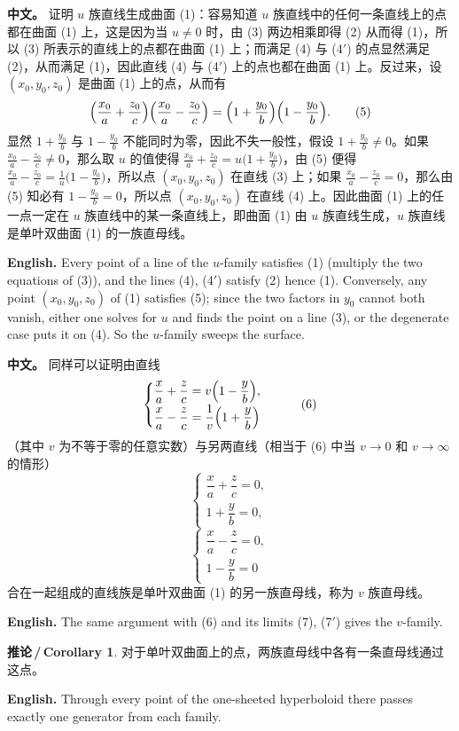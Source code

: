 \documentclass[UTF8,11pt,a4paper]{ctexart}
\newcommand{\APS}[2]{\par\noindent\textbf{中文。} #1\par\noindent\textbf{English.} #2\par\smallskip}
\newcommand{\EN}[1]{\par\noindent \textbf{English.} #1\par}
\theoremstyle{definition}
\newtheorem*{corollary}{推论\,/\,Corollary}
\begin{document}
\APS{证明 $u$ 族直线生成曲面 (1)：容易知道 $u$ 族直线中的任何一条直线上的点都在曲面 (1) 上，这是因为当 $u\ne0$ 时，由 (3) 两边相乘即得 (2) 从而得 (1)，所以 (3) 所表示的直线上的点都在曲面 (1) 上；而满足 (4) 与 (4$'$) 的点显然满足 (2)，从而满足 (1)，因此直线 (4) 与 (4$'$) 上的点也都在曲面 (1) 上。反过来，设 $(x_0,y_0,z_0)$ 是曲面 (1) 上的点，从而有
\[
\Bigl(\frac{x_0}{a}+\frac{z_0}{c}\Bigr)\Bigl(\frac{x_0}{a}-\frac{z_0}{c}\Bigr)=\Bigl(1+\frac{y_0}{b}\Bigr)\Bigl(1-\frac{y_0}{b}\Bigr).\tag{5}
\]
显然 $1+\frac{y_0}{b}$ 与 $1-\frac{y_0}{b}$ 不能同时为零，因此不失一般性，假设 $1+\frac{y_0}{b}\ne0$。如果 $\frac{x_0}{a}-\frac{z_0}{c}\ne0$，那么取 $u$ 的值使得 $\frac{x_0}{a}+\frac{z_0}{c}=u\bigl(1+\frac{y_0}{b}\bigr)$，由 (5) 便得 $\frac{x_0}{a}-\frac{z_0}{c}=\frac1u\bigl(1-\frac{y_0}{b}\bigr)$，所以点 $(x_0,y_0,z_0)$ 在直线 (3) 上；如果 $\frac{x_0}{a}-\frac{z_0}{c}=0$，那么由 (5) 知必有 $1-\frac{y_0}{b}=0$，所以点 $(x_0,y_0,z_0)$ 在直线 (4) 上。因此曲面 (1) 上的任一点一定在 $u$ 族直线中的某一条直线上，即曲面 (1) 由 $u$ 族直线生成，$u$ 族直线是单叶双曲面 (1) 的一族直母线。}{Every point of a line of the $u$-family satisfies (1) (multiply the two equations of (3)), and the lines (4), (4$'$) satisfy (2) hence (1). Conversely, any point $(x_0,y_0,z_0)$ of (1) satisfies (5); since the two factors in $y_0$ cannot both vanish, either one solves for $u$ and finds the point on a line (3), or the degenerate case puts it on (4). So the $u$-family sweeps the surface.}

\APS{同样可以证明由直线
\[
\begin{cases}\dfrac{x}{a}+\dfrac{z}{c}=v\Bigl(1-\dfrac{y}{b}\Bigr),\\[4pt] \dfrac{x}{a}-\dfrac{z}{c}=\dfrac1v\Bigl(1+\dfrac{y}{b}\Bigr)\end{cases}\tag{6}
\]
（其中 $v$ 为不等于零的任意实数）与另两直线（相当于 (6) 中当 $v\to0$ 和 $v\to\infty$ 的情形）
\[
\begin{cases}\dfrac{x}{a}+\dfrac{z}{c}=0,\\ 1+\dfrac{y}{b}=0,\end{cases}\tag{7}
\]
\[
\begin{cases}\dfrac{x}{a}-\dfrac{z}{c}=0,\\ 1-\dfrac{y}{b}=0\end{cases}\tag{7$'$}
\]
合在一起组成的直线族是单叶双曲面 (1) 的另一族直母线，称为 $v$ 族直母线。}{The same argument with (6) and its limits (7), (7$'$) gives the $v$-family.}

\begin{corollary}\label{cor:onegen}
对于单叶双曲面上的点，两族直母线中各有一条直母线通过这点。
\EN{Through every point of the one-sheeted hyperboloid there passes exactly one generator from each family.}
\end{corollary}
\end{document}
